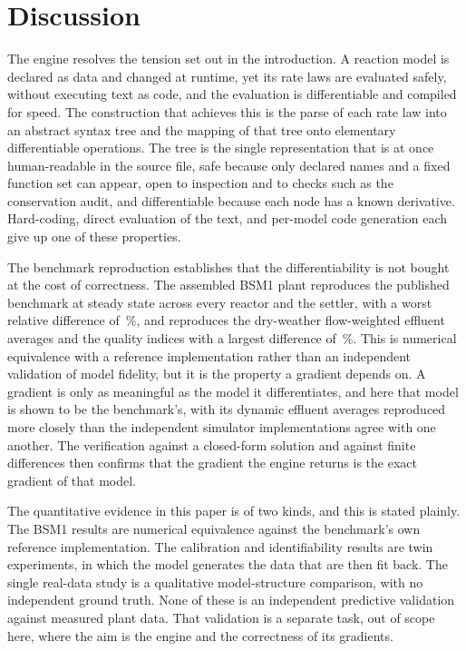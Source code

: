 \documentclass{article}
\begin{document}
\section{Discussion}
\label{sec:discussion}

The engine resolves the tension set out in the introduction. A reaction model is declared as data and changed at runtime, yet its rate laws are evaluated safely, without executing text as code, and the evaluation is differentiable and compiled for speed. The construction that achieves this is the parse of each rate law into an abstract syntax tree and the mapping of that tree onto elementary differentiable operations. The tree is the single representation that is at once human-readable in the source file, safe because only declared names and a fixed function set can appear, open to inspection and to checks such as the conservation audit, and differentiable because each node has a known derivative. Hard-coding, direct evaluation of the text, and per-model code generation each give up one of these properties.

The benchmark reproduction establishes that the differentiability is not bought at the cost of correctness. The assembled BSM1 plant reproduces the published benchmark at steady state across every reactor and the settler, with a worst relative difference of \SteadyReactorWorstPct\,\%, and reproduces the dry-weather flow-weighted effluent averages and the quality indices with a largest difference of \DynEffWorstPct\,\%. This is numerical equivalence with a reference implementation rather than an independent validation of model fidelity, but it is the property a gradient depends on. A gradient is only as meaningful as the model it differentiates, and here that model is shown to be the benchmark's, with its dynamic effluent averages reproduced more closely than the independent simulator implementations agree with one another. The verification against a closed-form solution and against finite differences then confirms that the gradient the engine returns is the exact gradient of that model.

The quantitative evidence in this paper is of two kinds, and this is stated plainly. The BSM1 results are numerical equivalence against the benchmark's own reference implementation. The calibration and identifiability results are twin experiments, in which the model generates the data that are then fit back. The single real-data study is a qualitative model-structure comparison, with no independent ground truth. None of these is an independent predictive validation against measured plant data. That validation is a separate task, out of scope here, where the aim is the engine and the correctness of its gradients.
\end{document}

